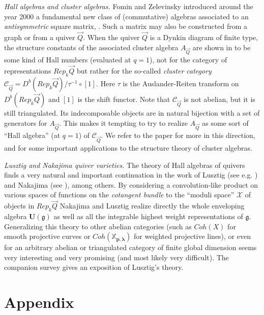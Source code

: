 \documentclass[a4paper,10pt]{amsart}
\def\U{\mathbf{U}}
\def\g{\mathfrak{g}}
\def\xpl{\mathbb{X}_{\mathbf{p},\boldsymbol{\lambda}}}
\numberwithin{equation}{section}
\begin{document}
{\noindent
\textit{Hall algebras and cluster algebras.} Fomin and Zelevinsky introduced around the year 2000 a fundamental new class of (commutative) algebras
associated to an \textit{antisymmetric} square matrix, \cite{FZ}. Such a matrix may also be constructed from a graph or from a quiver $\vec{Q}$.
When the quiver $\vec{Q}$ is a Dynkin diagram of finite type, the structure constants of the associated cluster algebra $A_{\vec{Q}}$ are shown in \cite{CalKel} to be some kind of Hall numbers (evaluated at $q=1$), not for the category of representations $Rep_k\vec{Q}$ but rather for the so-called \textit{cluster category} $\mathcal{C}_{\vec{Q}}=D^b(Rep_k\vec{Q})/\tau^{-1} \circ [1]$. Here $\tau$ is the Auslander-Reiten transform on $D^b(Rep_k\vec{Q})$ and $[1]$ is the shift functor. Note that $\mathcal{C}_{\vec{Q}}$ is not abelian, but it is still triangulated. Its indecomposable objects are in natural bijection with a set of generators for $A_{\vec{Q}}$. This makes it tempting to try to realize $A_{\vec{Q}}$ as some sort of ``Hall algebra'' (at $q=1$) of $\mathcal{C}_{\vec{Q}}$. We refer to the paper \cite{CalKeller} for more in this direction, and for some important applications to the structure theory of cluster algebras.

\vspace{.2in}

\noindent
\textit{Lusztig and Nakajima quiver varieties.} The theory of Hall algebras of quivers finds a very natural and important continuation in the work of Lusztig (see e.g. \cite{Lusztignilp}) and Nakajima (see \cite{Nak1}), among others. By considering a convolution-like product on various spaces of functions on
the \textit{cotangent bundle} to the ``moduli space'' $\mathcal{X}$ of objects in $Rep_k\vec{Q}$ Nakajima and Lusztig realize directly the whole enveloping algebra $\U(\g)$ as well as all the integrable highest weight representations of $\g$. Generalizing this theory to other abelian categories (such as $Coh(X)$ for smooth projective curves or $Coh(\xpl)$ for weighted projective lines), or even for an arbitrary abelian or triangulated category of finite global dimension seems very interesting and very promising (and most likely very difficult). The companion survey \cite{SLectures2} gives an exposition of Lusztig's theory.

\newpage

\appendix
\section{Appendix}

}
\end{document}
